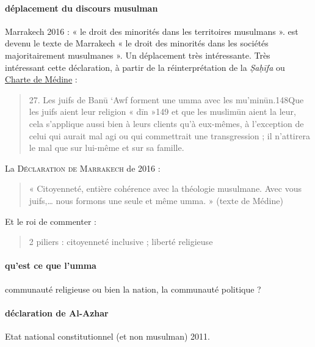 \paragraph{déplacement du discours musulman}
Marrakech 2016 : « le droit des minorités dans les territoires musulmans ». est devenu le texte de Marrakech « le droit des minorités dans les sociétés majoritairement musulmanes ». Un déplacement très intéressante.
Très intéressant cette déclaration, à partir de la réinterprétation de la \textit{Ṣaḥīfa} ou \href{https://theses.hal.science/tel-02079610/document}{Charte de Médine} : 

\begin{quote}
    27. Les juifs de Banū ‘Awf forment une umma avec les mu’minūn.148Que les juifs aient leur religion
« dīn »149 et que les muslimūn aient la leur, cela s’applique aussi bien à leurs clients qu’à eux-mêmes, à l’exception de celui qui aurait mal agi ou qui commettrait une transgression ; il n’attirera le mal que sur lui-même et sur sa famille.
\end{quote}

La \textsc{Déclaration de Marrakech} de 2016 : 
\begin{quote}

« Citoyenneté, entière cohérence avec la théologie musulmane. Avec vous juifs,… nous formons une seule et même umma. » (texte de Médine)
\end{quote}
Et le roi de commenter : 
\begin{quote}
2 piliers : citoyenneté inclusive ; liberté religieuse
\end{quote}

\paragraph{qu’est ce que l’umma} communauté religieuse ou bien la nation, la communauté politique ?

\paragraph{déclaration de Al-Azhar} Etat national constitutionnel (et non musulman) 2011. 
